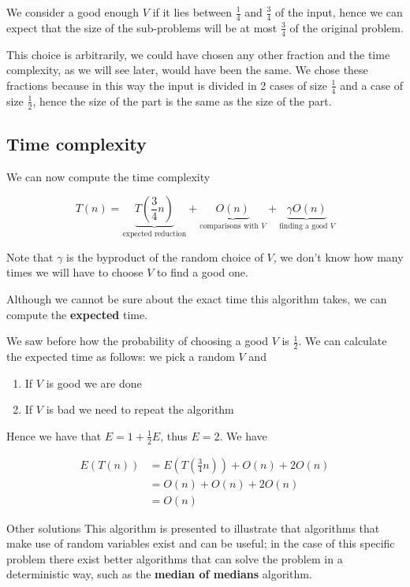 \documentclass[10pt]{extarticle}
\begin{document}
We consider a good enough $V$ if it lies between $\frac{1}{4}$ and $\frac{3}{4}$ of the input,
hence we can expect that the size of the sub-problems will be at most $\frac{3}{4}$ of the original problem.

This choice is arbitrarily, we could have chosen any other fraction and the time complexity,
as we will see later, would have been the same.
We chose these fractions because in this way the input
is divided in 2  cases of size $\frac{1}{4}$ and a  case of size $\frac{1}{2}$,
hence the size of the  part is the same as the size of the  part.

\subsection{Time complexity}

We can now compute the time complexity

$$
    T(n) = \underbrace{T\left(\frac{3}{4}n\right)}
    _{\text{expected reduction}} +
    \underbrace{O(n)}_{\text{comparisons with } V}
    + \underbrace{\gamma O(n)}_{\text{finding a good } V}
$$

Note that $\gamma$ is the byproduct of the random choice of $V$,
we don't know how many times we will have to choose $V$ to find a good one.

Although we cannot be sure about the exact time this algorithm takes,
we can compute the \textbf{expected} time.

We saw before how the probability of choosing a good $V$ is $\frac{1}{2}$.
We can calculate the expected time as follows:
we pick a random $V$ and

\begin{enumerate}
    \item If $V$ is good we are done
    \item If $V$ is bad we need to repeat the algorithm
\end{enumerate}

Hence we have that $E = 1 + \frac{1}{2} E$, thus $E = 2$.
We have


\begin{align*}
    E(T(n)) & = E\left(T\left(\frac{3}{4}n\right)\right) + O(n) + 2O(n) \\
            & = O(n) + O(n) + 2O(n)                                     \\
            & = O(n)
\end{align*}

\begin{notebox}{Other solutions}
    This algorithm is presented to illustrate that algorithms that make use of random variables exist and can be useful;
    in the case of this specific problem there exist better algorithms that can solve the problem in a deterministic way,
    such as the \textbf{median of medians} algorithm.
\end{notebox}
\end{document}
